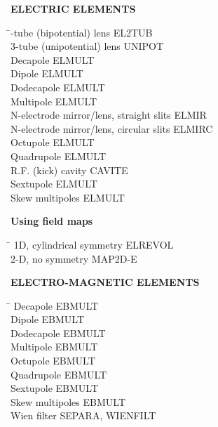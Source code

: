 \bigskip

\bigskip

\noindent\textbf{ELECTRIC ELEMENTS}  

\begin{tabbing}
\hspace*{7cm} \= -tube (bipotential) lens \> EL2TUB \\
  3-tube (unipotential) lens \> UNIPOT \\
  Decapole                \> ELMULT \\
  Dipole                  \> ELMULT \\
  Dodecapole              \> ELMULT \\
  Multipole               \> ELMULT \\
  N-electrode mirror/lens, straight slits            \> ELMIR \\
  N-electrode mirror/lens, circular slits            \> ELMIRC \\
  Octupole                \> ELMULT \\
  Quadrupole              \> ELMULT \\
  R.F. (kick) cavity             \> CAVITE \\
  Sextupole               \> ELMULT \\
  Skew multipoles       \> ELMULT 
\end{tabbing}


\smallskip

\noindent\textbf{Using field maps} 

\begin{tabbing}
\hspace*{7cm} \= \kill
 1D, cylindrical symmetry  \> ELREVOL  \\
  2-D, no symmetry          \> MAP2D-E 
\end{tabbing}

\bigskip

\bigskip

\noindent\textbf{ELECTRO-MAGNETIC ELEMENTS}  

\begin{tabbing}
\hspace*{7cm} \= \kill
  Decapole                \> EBMULT \\
  Dipole                  \> EBMULT \\
  Dodecapole              \> EBMULT \\
  Multipole               \> EBMULT \\
  Octupole                \> EBMULT \\
  Quadrupole              \> EBMULT \\
  Sextupole               \> EBMULT \\
  Skew multipoles       \> EBMULT \\
  Wien filter             \> SEPARA, WIENFILT 
\end{tabbing} 

